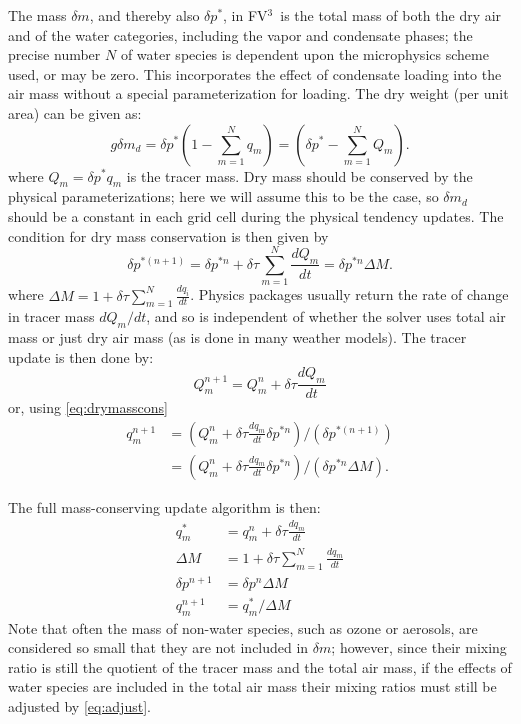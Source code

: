 \documentclass[12pt,letterpaper]{book}
\newcommand{\fv}{FV$^{\mathrm{3}}$}
\begin{document}
The mass $\delta m$, and thereby also $\delta p^*$, in \fv\ is the total mass of both the dry air and of the water categories, including the vapor and condensate phases; the precise number $N$ of water species is dependent upon the microphysics scheme used, or may be zero. This incorporates the effect of condensate loading into the air mass without a special parameterization for loading. The dry weight (per unit area) can be given as:
\begin{equation}
g \delta m_d = \delta p^* \left ( 1 - \sum_{m=1}^N q_m \right ) = \left ( \delta p^* - \sum_{m=1}^N Q_m \right ).
\end{equation}
where $Q_m = \delta p^* q_m$ is the tracer mass. Dry mass should be conserved by the physical parameterizations; here we will assume this to be the case, so $\delta m_d$ should be a constant in each grid cell during the physical tendency updates. The condition for dry mass conservation is then given by
\begin{equation} \label{eq:drymasscons}
\delta p^{*(n+1)} = \delta p^{*n} + \delta \tau  \sum_{m=1}^N \frac{dQ_m}{dt} = \delta p^{*n} \Delta M.
\end{equation}
where $\Delta M = 1 + \delta \tau \sum_{m=1}^N \frac{dq_i}{dt}$. Physics packages usually return the rate of change in tracer mass $dQ_m/dt$, and so is independent of whether the solver uses total air mass or just dry air mass (as is done in many weather models). The tracer update is then done by:
\begin{equation}
Q^{n+1}_m = Q^n_m + \delta \tau \frac{dQ_m}{dt}
\end{equation}
or, using \eqref{eq:drymasscons}
\begin{align}
q^{n+1}_m &=  \left( Q^n_m + \delta \tau \frac{dq_m}{dt} \delta p^{*n} \right) / \left( \delta p^{*(n+1)} \right) \\
&= \left( Q^n_m + \delta \tau \frac{dq_m}{dt} \delta p^{*n} \right) / \left( \delta p^{*n} \Delta M \right).
\end{align}

The full mass-conserving update algorithm is then:
\begin{align}
q_m^* &= q_m^{n} + \delta \tau \frac{dq_m}{dt} \\
\Delta M &= 1 + \delta \tau \sum_{m=1}^N  \frac{dq_m}{dt}  \\
\delta p^{n+1} &= \delta p^{n} \Delta M \\
q_m^{n+1} &= q_m^{*} / \Delta M \label{eq:adjust}
\end{align}
Note that often the mass of non-water species, such as ozone or aerosols, are considered so small that they are not included in $\delta m$; however, since their mixing ratio is still the quotient of the tracer mass and the total air mass, if the effects of water species are included in the total air mass their mixing ratios must still be adjusted by \eqref{eq:adjust}.
\end{document}
